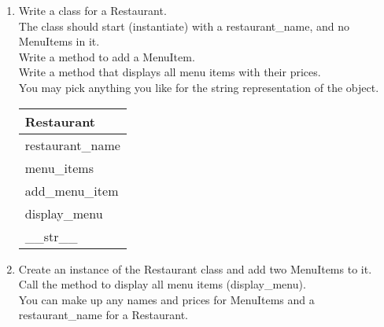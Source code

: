 \documentclass{article}
\begin{document}
\begin{enumerate}
\begin{enumerate}
		\item
			Write a class for a Restaurant. \\
			The class should start (instantiate) with a restaurant\_name, and no MenuItems in it. \\ 
			Write a method to add a MenuItem.\\
			Write a method that displays all menu items with their prices.\\
			You may pick anything you like for the string representation of the object.
	
			\begin{flushright}
			\begin{tabular}{|l|}
				\hline
				Restaurant\\ \hline  	%
				restaurant\_name \\ menu\_items\\ \hline		%
				add\_menu\_item \\ display\_menu \\ \_\_str\_\_ \\ \hline		%
			\end{tabular}
			\end{flushright}

		\item
			Create an instance of the Restaurant class and add two MenuItems to it.\\
			Call the method to display all menu items (display\_menu).\\
			You can make up any names and prices for MenuItems and a restaurant\_name for a Restaurant.\\
	\end{enumerate}
\pagebreak



\end{enumerate}
\end{document}
